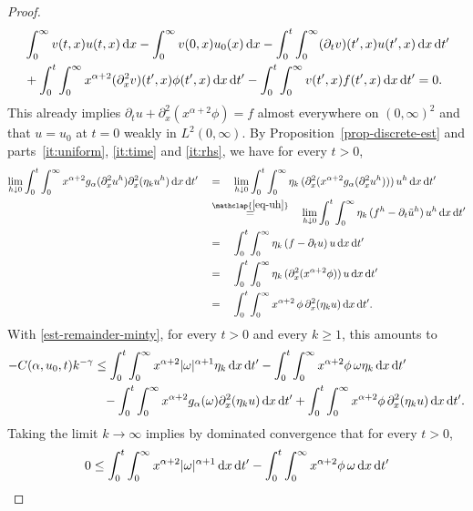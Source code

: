 \documentclass[reqno,12pt]{amsart}
\renewcommand{\d}{\ensuremath{\mathrm{d}}}
\renewcommand{\d}{\ensuremath{{\rm d}}}
\numberwithin{equation}{section}
\begin{document}
\begin{proof}
%
\begin{align}\nonumber
& \int_0^\infty v(t,x) u(t,x) \, \d x - \int_0^\infty v(0,x) u_0(x) \, \d x - \int_0^t \int_0^\infty (\partial_t v)(t',x) u(t',x) \, \d x \, \d t'\\
& + \int_0^t \int_0^\infty x^{\alpha+2} (\partial_x^2 v)(t',x) \phi(t',x) \, \d x \, \d t' - \int_0^t \int_0^\infty v(t',x) f(t',x) \, \d x \, \d t' = 0. \label{eq-u-weak}
\end{align}
%
This already implies $\partial_t u + \partial_x^2 (x^{\alpha+2} \phi) = f$ almost everywhere on $(0,\infty)^2$ and that $u = u_0$ at $t = 0$ weakly in $L^2(0,\infty)$. By Proposition~\ref{prop-discrete-est} and parts~\eqref{it:uniform}, \eqref{it:time} and \eqref{it:rhs}, we have for every $t>0$,
%
\begin{align*}
\lim_{h \downarrow 0} \int_0^t \int_0^\infty x^{\alpha+2} g_\alpha(\partial_x^2 u^h) \partial_x^2 (\eta_k u^h) \, \d x \, \d t' \quad &= \quad \lim_{h \downarrow 0} \int_0^t \int_0^\infty \eta_k \, (\partial_x^2 (x^{\alpha+2} g_\alpha(\partial_x^2 u^h))) \, u^h \, \d x \, \d t' \\
&\stackrel{\mathclap{\eqref{eq-uh}}}{=} \quad \lim_{h \downarrow 0} \int_0^t \int_0^\infty \eta_k \, (f^h - \partial_t \tilde u^h) \, u^h \, \d x \, \d t' \\
&= \quad \int_0^t \int_0^\infty \eta_k \, (f - \partial_t u) \, u \, \d x \, \d t' \\
&= \quad \int_0^t \int_0^\infty \eta_k \, (\partial_x^2 (x^{\alpha+2} \phi)) \, u \, \d x \, \d t' \\
&= \quad \int_0^t \int_0^\infty x^{\alpha+2} \, \phi \, \partial_x^2 (\eta_k u) \, \d x \, \d t'.
\end{align*}
%
With \eqref{est-remainder-minty}, for every $t > 0$ and every $k \ge 1$, this amounts to
%
\begin{align*}
- C(\alpha,u_0,t) k^{-\gamma} &\le \int_0^t \int_0^\infty x^{\alpha+2} |\omega|^{\alpha+1} \eta_k \, \d x \, \d t' - \int_0^t \int_0^\infty x^{\alpha+2} \phi \,  \omega \eta_k \, \d x \, \d t' \\
& \phantom{=} - \int_0^t \int_0^\infty x^{\alpha+2} g_\alpha(\omega) \partial_x^2 (\eta_k u) \, \d x \, \d t' + \int_0^t \int_0^\infty x^{\alpha+2} \phi \, \partial_x^2 (\eta_k u) \, \d x \, \d t'.
\end{align*}
%
Taking the limit $k \to \infty$ implies by dominated convergence that for every $t > 0$,
%
\begin{align*}
0 &\le \int_0^t \int_0^\infty x^{\alpha+2} |\omega|^{\alpha+1} \, \d x \, \d t' - \int_0^t \int_0^\infty x^{\alpha+2} \phi \, \omega \, \d x \, \d t' \\

\end{align*}
\end{proof}
\end{document}
